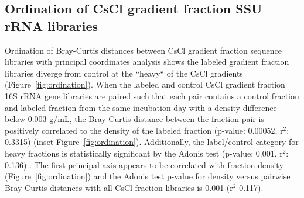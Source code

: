 \subsection{Ordination of CsCl gradient fraction SSU rRNA libraries} Ordination
of Bray-Curtis \citep{Bray_1957} distances between CsCl gradient fraction
sequence libraries with principal coordinates analysis shows the labeled
gradient fraction libraries diverge from control at the ``heavy`` of the CsCl
gradients (Figure~\ref{fig:ordination}). When the labeled and control CsCl
gradient fraction 16S rRNA gene libraries are paired such that each pair
contains a control fraction and labeled fraction from the same incubation day
with a density difference below 0.003 g/mL, the Bray-Curtis distance between
the fraction pair is positively correlated to the density of the labeled
fraction (p-value: 0.00052, r$^{2}$: 0.3315) (inset
Figure~\ref{fig:ordination}).  Additionally, the label/control category for
heavy fractions is statistically significant by the Adonis test (p-value:
0.001, r$^{2}$: 0.136) \citep{Anderson_2001}. The first principal axis appears
to be correlated with fraction density (Figure~\ref{fig:ordination}) and the
Adonis test p-value for density versus pairwise Bray-Curtis distances with all
CsCl fraction libraries is 0.001 (r$^{2}$ 0.117).

